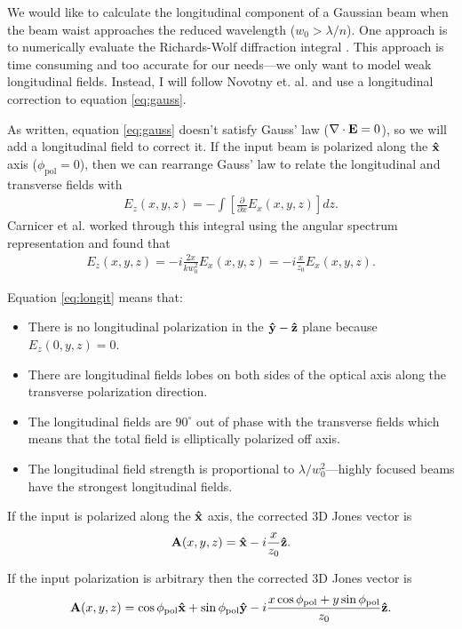 \documentclass[11pt]{article}
\begin{document}
We would like to calculate the longitudinal component of a Gaussian beam when
the beam waist approaches the reduced wavelength ($w_0 > \lambda/n$). One
approach is to numerically evaluate the Richards-Wolf diffraction integral
\cite{richards, biobeam}. This approach is time consuming and too
accurate for our needs---we only want to model weak longitudinal
fields. Instead, I will follow Novotny et. al. \cite{nov} and use a longitudinal
correction to equation \ref{eq:gauss}.

As written, equation \ref{eq:gauss} doesn't satisfy Gauss' law
($\nabla \cdot \mathbf{E} = 0$), so we will add a longitudinal field to correct
it. If the input beam is polarized along the $\mathbf{\hat{x}}$ axis
($\phi_{\text{pol}}=0$), then we can rearrange Gauss' law to relate the
longitudinal and transverse fields with
\begin{align}
  E_z(x, y, z) = - \int \left[\frac{\partial}{\partial x} E_x(x,y,z)\right]dz. 
\end{align}
Carnicer et al. \cite{carnicer} worked through this integral using the angular
spectrum representation and found that
\begin{align}
  E_z(x,y,z) = -i\frac{2x}{kw_0^2}E_x(x,y,z) = -i\frac{x}{z_0}E_x(x,y,z)\label{eq:longit}. 
\end{align}

Equation \ref{eq:longit} means that:
\begin{itemize}
\item There is no longitudinal polarization in the $\mathbf{\hat{y}}-\mathbf{\hat{z}}$ plane
  because $E_z(0,y,z) = 0$.
\item There are longitudinal fields lobes on both sides of the optical axis
  along the transverse polarization direction.
\item The longitudinal fields are $90^{\circ}$ out of phase with the transverse
  fields which means that the total field is elliptically polarized off axis.
\item The longitudinal field strength is proportional to
  $\lambda/w_0^2$---highly focused beams have the strongest longitudinal fields.
\end{itemize}

If the input is polarized along the $\mathbf{\hat{x}}$ axis, the corrected 3D Jones vector is
\begin{align}
\mathbf{A}(x,y,z) = \mathbf{\hat{x}}- i\frac{x}{z_0}\mathbf{\hat{z}}.
\end{align}

If the input polarization is arbitrary then the corrected 3D Jones vector is
\begin{align}
  \mathbf{A}(x,y,z) = \cos\phi_{\text{pol}}\mathbf{\hat{x}} + \sin\phi_{\text{pol}}\mathbf{\hat{y}} - i\frac{x\cos\phi_{\text{pol}} + y\sin\phi_{\text{pol}}}{z_0}\mathbf{\hat{z}}.
\end{align}
\end{document}

